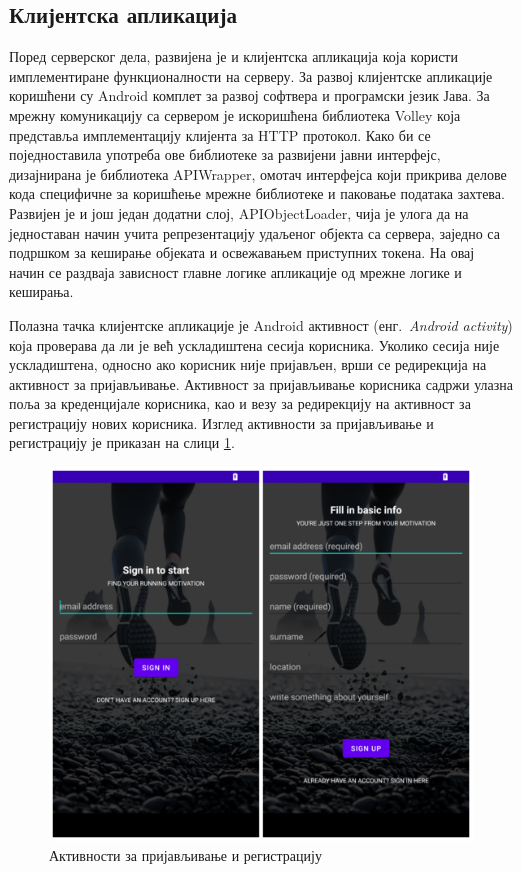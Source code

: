 \documentclass[12pt,oneside]{memoir}
\begin{document}
\subsection{Клијентска апликација}
Поред серверског дела, развијена је и клијентска апликација која користи имплементиране функционалности на серверу. За развој клијентске апликације коришћени су Android комплет за развој софтвера и програмски језик Јава. За мрежну комуникацију са сервером је искоришћена библиотека Volley \cite{volley} која представља имплементацију клијента за HTTP протокол. Како би се поједноставила употреба ове библиотеке за развијени јавни интерфејс, дизајнирана је библиотека APIWrapper, омотач интерфејса који прикрива делове кода специфичне за коришћење мрежне библиотеке и паковање података захтева. Развијен је и још један додатни слој, APIObjectLoader, чија је улога да на једноставан начин учита репрезентацију удаљеног објекта са сервера, заједно са подршком за кеширање објеката и освежавањем приступних токена. На овај начин се раздваја зависност главне логике апликације од мрежне логике и кеширања.

Полазна тачка клијентске апликације је Android активност (енг.~\textit{Android activity}) која проверава да ли је већ ускладиштена сесија корисника. Уколико сесија није ускладиштена, односно ако корисник није пријављен, врши се редирекција на активност за пријављивање. Активност за пријављивање корисника садржи улазна поља за креденцијале корисника, као и везу за редирекцију на активност за регистрацију нових корисника. Изглед активности за пријављивање и регистрацију је приказан на слици \ref{fig:registracija_logovanje}.

\begin{figure}[!ht]
  \centering
  \includegraphics[scale=0.7]{slike/registracija-logovanje.png}
  \caption{Активности за пријављивање и регистрацију}
  \label{fig:registracija_logovanje}
\end{figure}
\end{document}
